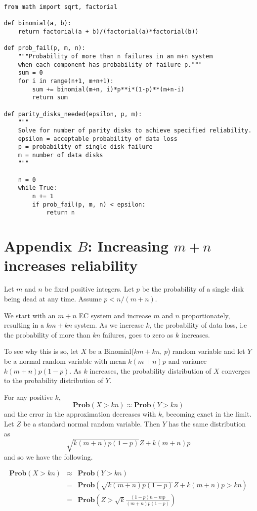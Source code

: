 \documentclass[11pt]{article}
\begin{document}
\begin{verbatim}
from math import sqrt, factorial

def binomial(a, b):
    return factorial(a + b)/(factorial(a)*factorial(b))

def prob_fail(p, m, n):
    """Probability of more than n failures in an m+n system 
    when each component has probability of failure p."""
    sum = 0
    for i in range(n+1, m+n+1):
        sum += binomial(m+n, i)*p**i*(1-p)**(m+n-i)
        return sum

def parity_disks_needed(epsilon, p, m):
    """
    Solve for number of parity disks to achieve specified reliability.
    epsilon = acceptable probability of data loss
    p = probability of single disk failure
    m = number of data disks
    """

    n = 0
    while True:
        n += 1
        if prob_fail(p, m, n) < epsilon:
            return n  
\end{verbatim}

\section{Appendix $B$: Increasing $m+n$ increases reliability} 

Let $m$ and $n$ be fixed positive integers. Let $p$ be the probability of a single disk being dead at any time. Assume $p < n/(m+n)$.

We start with an $m+n$ EC system and increase $m$ and $n$ proportionately, resulting in a $km + kn$ system. As we increase $k$, the probability of data loss, i.e the probability of more than $kn$ failures, goes to zero as $k$ increases.

To see why this is so, let $X$ be a Binomial($km + kn$, $p$) random variable and let $Y$ be a normal random variable with mean $k(m+n)p$ and variance $k(m+n)p(1-p)$. As $k$ increases, the probability distribution of $X$ converges to the probability distribution of $Y$. 

For any positive $k$, 
\[ \mathbf{Prob}(X > kn) \approx \mathbf{Prob}(Y > kn) \]
and the error in the approximation decreases with $k$, becoming exact in the limit. Let $Z$ be a standard normal random variable. Then $Y$ has the same distribution as 
\[\sqrt{k(m+n)p(1-p)} Z  + k(m+n)p\]
and so we have the following.

\begin{eqnarray*}
\mathbf{Prob}(X > kn) &\approx& \mathbf{Prob}(Y > kn) \\
&=& \mathbf{Prob}(\sqrt{k(m+n)p(1-p)} Z + k(m+n)p > kn) \\
&=& \mathbf{Prob}\left(Z > \sqrt{k} \frac{(1-p)n - mp}{(m+n)p(1-p)}\right) 
\end{eqnarray*}
\end{document}
